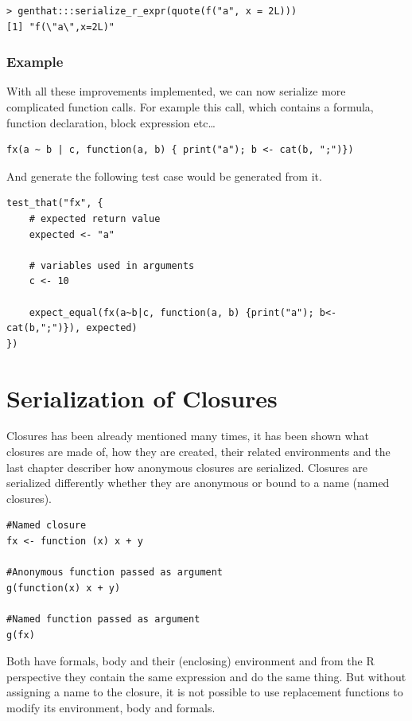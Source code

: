 \documentclass[thesis=B,english]{FITthesis}[2012/10/20]
\begin{document}
\begin{verbatim}
> genthat:::serialize_r_expr(quote(f("a", x = 2L)))
[1] "f(\"a\",x=2L)"
\end{verbatim}

\subsection{Example}
With all these improvements implemented, we can now serialize more complicated function calls. For example this call, which contains a formula, function declaration, block expression etc\ldots

\begin{verbatim}
fx(a ~ b | c, function(a, b) { print("a"); b <- cat(b, ";")})
\end{verbatim}

And generate the following test case would be generated from it.
\begin{verbatim}
test_that("fx", {
    # expected return value
    expected <- "a"

    # variables used in arguments
    c <- 10
    
    expect_equal(fx(a~b|c, function(a, b) {print("a"); b<-cat(b,";")}), expected)
})
\end{verbatim}

\chapter{Serialization of Closures}
Closures has been already mentioned many times, it has been shown what closures are made of, how they are created, their related environments and the last chapter describer how anonymous closures are serialized. Closures are serialized differently whether they are anonymous or bound to a name (named closures). 

\begin{verbatim}
#Named closure
fx <- function (x) x + y

#Anonymous function passed as argument
g(function(x) x + y)

#Named function passed as argument
g(fx)

\end{verbatim}


Both have formals, body and their (enclosing) environment and from the R perspective they contain the same expression and do the same thing. But without assigning a name to the closure, it is not possible to use replacement functions to modify its environment, body and formals. 
\end{document}

